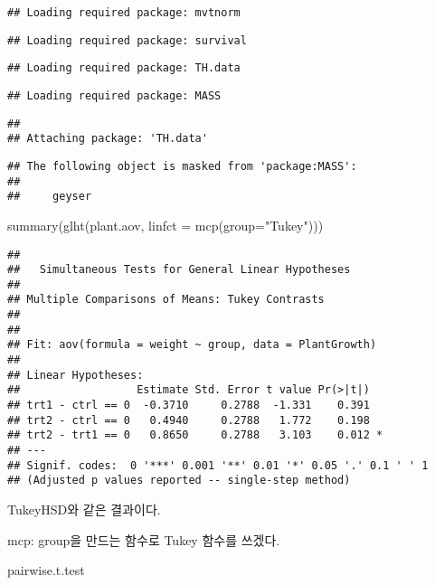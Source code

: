 \documentclass[
]{article}
\newenvironment{Shaded}{\begin{snugshade}}{\end{snugshade}}
\newcommand{\AttributeTok}[1]{\textcolor[rgb]{0.77,0.63,0.00}{#1}}
\newcommand{\FunctionTok}[1]{\textcolor[rgb]{0.00,0.00,0.00}{#1}}
\newcommand{\NormalTok}[1]{#1}
\newcommand{\StringTok}[1]{\textcolor[rgb]{0.31,0.60,0.02}{#1}}
\begin{document}
\begin{verbatim}
## Loading required package: mvtnorm
\end{verbatim}

\begin{verbatim}
## Loading required package: survival
\end{verbatim}

\begin{verbatim}
## Loading required package: TH.data
\end{verbatim}

\begin{verbatim}
## Loading required package: MASS
\end{verbatim}

\begin{verbatim}
## 
## Attaching package: 'TH.data'
\end{verbatim}

\begin{verbatim}
## The following object is masked from 'package:MASS':
## 
##     geyser
\end{verbatim}

\begin{Shaded}
\begin{Highlighting}[]
\FunctionTok{summary}\NormalTok{(}\FunctionTok{glht}\NormalTok{(plant.aov, }\AttributeTok{linfct =} \FunctionTok{mcp}\NormalTok{(}\AttributeTok{group=}\StringTok{"Tukey"}\NormalTok{)))}
\end{Highlighting}
\end{Shaded}

\begin{verbatim}
## 
##   Simultaneous Tests for General Linear Hypotheses
## 
## Multiple Comparisons of Means: Tukey Contrasts
## 
## 
## Fit: aov(formula = weight ~ group, data = PlantGrowth)
## 
## Linear Hypotheses:
##                  Estimate Std. Error t value Pr(>|t|)  
## trt1 - ctrl == 0  -0.3710     0.2788  -1.331    0.391  
## trt2 - ctrl == 0   0.4940     0.2788   1.772    0.198  
## trt2 - trt1 == 0   0.8650     0.2788   3.103    0.012 *
## ---
## Signif. codes:  0 '***' 0.001 '**' 0.01 '*' 0.05 '.' 0.1 ' ' 1
## (Adjusted p values reported -- single-step method)
\end{verbatim}

TukeyHSD와 같은 결과이다.

mcp: group을 만드는 함수로 Tukey 함수를 쓰겠다.

\begin{Shaded}
\begin{Highlighting}[]
\NormalTok{pairwise.t.test}
\end{Highlighting}
\end{Shaded}
\end{document}
